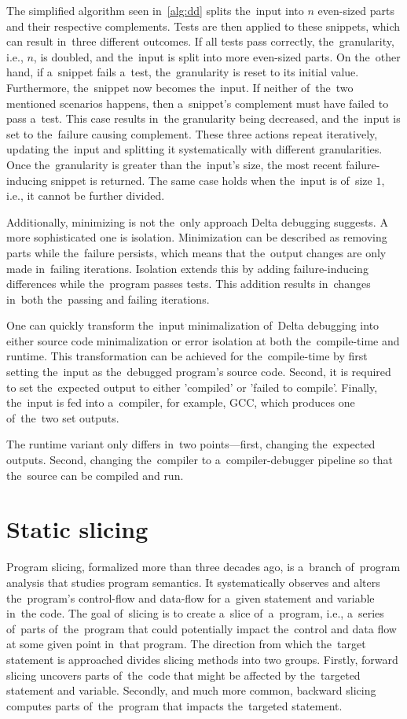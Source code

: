 The simplified algorithm seen in~\ref{alg:dd} splits the~input into $n$ even-sized
parts and their respective complements. 
Tests are then applied to these snippets, which can result in~three different outcomes. 
If all tests pass correctly, the~granularity, i.e., $n$, is doubled, and the~input is split
into more even-sized parts. 
On the~other hand, if a~snippet fails a~test, the~granularity is reset to its initial value.
Furthermore, the~snippet now becomes the~input. 
If neither of~the~two mentioned scenarios happens, 
then a~snippet's complement must have failed to pass a~test. 
This case results in~the granularity being decreased, 
and the~input is set to the~failure causing complement.
These three actions repeat iteratively, updating the~input and 
splitting it systematically with different granularities. 
Once the~granularity is greater than the~input's size, 
the most recent failure-inducing snippet is returned. 
The same case holds when the~input is of~size $1$, i.e., it cannot be further divided.

Additionally, minimizing is not the~only approach Delta debugging suggests.
A more sophisticated one is isolation. Minimization can be described as removing parts
while the~failure persists, which means that the~output changes are only made in~failing
iterations.
Isolation extends this by adding failure-inducing differences while the~program passes tests.
This addition results in~changes in~both the~passing and failing iterations.

One can quickly transform the~input minimalization of~Delta debugging into either source
code minimalization or error isolation at both the~compile-time and runtime.
This transformation can be achieved for the~compile-time by first setting the~input
as the~debugged program's source code. 
Second, it is required to set the~expected
output to either 'compiled' or 'failed to compile'. 
Finally, the~input is fed into a~compiler, for example, GCC, which produces
one of~the~two set outputs. 

The runtime variant only differs in~two points—first, changing the~expected outputs. 
Second, changing the~compiler to a~compiler-debugger pipeline so that the~source 
can be compiled and run.

\section{Static slicing}

Program slicing, formalized more than three decades ago,
is a~branch of~program analysis that studies program semantics.
It systematically observes and alters the~program's control-flow
and data-flow for a~given statement and variable in~the code.  
The goal of~slicing is to create a~slice of~a~program,
i.e., a~series of~parts of~the~program that could potentially
impact the~control and data flow at some given point in~that program. 
The direction from which the~target statement is approached divides 
slicing methods into two groups. 
Firstly, forward slicing uncovers parts of~the~code that 
might be affected by the~targeted statement and variable. 
Secondly, and much more common, backward slicing computes 
parts of~the~program that impacts the~targeted statement.

